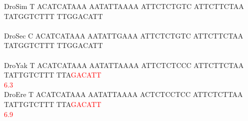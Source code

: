 \documentclass[11pt,twoside,reqno,a4paper]{article}
\begin{document}
{DroSim	T	ACATCATAAA	AATATTAAAA	ATTCTCTGTC	ATTCTTCTAA	TATGGTCTTT	TTGGACATT\\
\hspace*{7\charwidth}\hspace*{1\charwidth}\hspace*{1\charwidth}\hspace*{1\charwidth}\hspace*{1\charwidth}\hspace*{1\charwidth}\hspace*{1\charwidth}\\
DroSec	C	ACATCATAAA	AATATTGAAA	ATTCTCTGTC	ATTCTTCTAA	TATGGTCTTT	TTGGACATT\\
\hspace*{7\charwidth}\hspace*{1\charwidth}\hspace*{1\charwidth}\hspace*{1\charwidth}\hspace*{1\charwidth}\hspace*{1\charwidth}\hspace*{1\charwidth}\\
DroYak	T	ACATCATAAA	AATATTAAAA	ATTCTCTCCC	ATTCTTCTAA	TATTGTCTTT	TTA\textcolor{Red}{G}\textcolor{Red}{A}\textcolor{Red}{C}\textcolor{Red}{A}\textcolor{Red}{T}\textcolor{Red}{T}\\
\hspace*{7\charwidth}\hspace*{1\charwidth}\hspace*{1\charwidth}\hspace*{1\charwidth}\hspace*{1\charwidth}\hspace*{1\charwidth}\hspace*{1\charwidth}\hspace*{54\charwidth}\textcolor{Red}{6.3}\\
DroEre	T	ACATCATAAA	AATATTAAAA	ACTCTCCTCC	ATTCTCTTAA	TATTGTCTTT	TTA\textcolor{Red}{G}\textcolor{Red}{A}\textcolor{Red}{C}\textcolor{Red}{A}\textcolor{Red}{T}\textcolor{Red}{T}\\
\hspace*{7\charwidth}\hspace*{1\charwidth}\hspace*{1\charwidth}\hspace*{1\charwidth}\hspace*{1\charwidth}\hspace*{1\charwidth}\hspace*{1\charwidth}\hspace*{54\charwidth}\textcolor{Red}{6.9}\\
}
\end{document}
